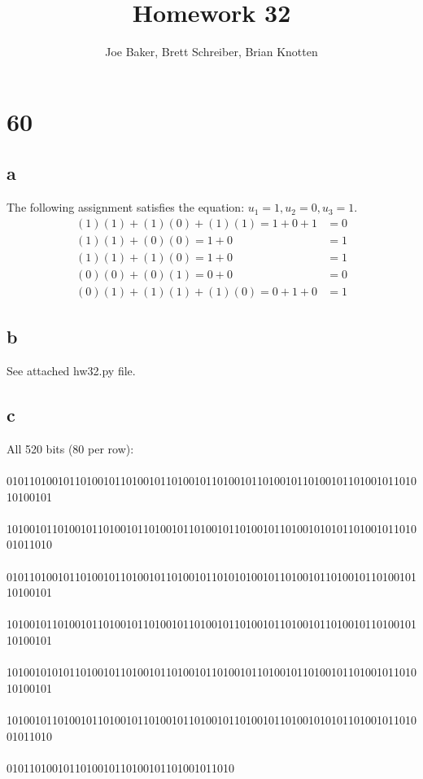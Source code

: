 \documentclass[letterpaper,notitlepage,twoside]{article}
\begin{document}
\title{Homework 32}
\author{Joe Baker, Brett Schreiber, Brian Knotten}
\maketitle

\section*{60}
\subsection*{a}
The following assignment satisfies the equation: $u_1 = 1, u_2 = 0, u_3 = 1$.
\begin{align*}
(1)(1) + (1)(0) + (1)(1) = 1 + 0 + 1 &= 0 \\
(1)(1) + (0)(0) = 1 + 0 &= 1 \\
(1)(1) + (1)(0) = 1 + 0 &= 1 \\
(0)(0) + (0)(1) = 0 + 0 &= 0 \\
(0)(1) + (1)(1) + (1)(0) = 0 + 1 + 0 &= 1
\end{align*}

\subsection*{b}
See attached hw32.py file.

\subsection*{c}
All 520 bits (80 per row):
\\\\
01011010010110100101101001011010010110100101101001011010010110100101101010100101
\\\\
10100101101001011010010110100101101001011010010110100101010110100101101001011010
\\\\
01011010010110100101101001011010010110101010010110100101101001011010010110100101
\\\\
10100101101001011010010110100101101001011010010110100101101001011010010110100101
\\\\
10100101010110100101101001011010010110100101101001011010010110100101101010100101
\\\\
10100101101001011010010110100101101001011010010110100101010110100101101001011010
\\\\
0101101001011010010110100101101001011010
\end{document}
